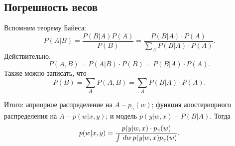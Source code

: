 \subsection{Погрешность весов}

Вспомним теорему Байеса:
\begin{equation*}
    P(A|B) = \frac{P(B|A) P(A)}{P(B)} = 
    \frac{P(B|A) \cdot P(A)}{\sum_A P(B|A) \cdot P(A)}.
\end{equation*}
Действительно,
\begin{equation*}
    P(A, B) = P(A|B) \cdot P(B) = P(B|A) \cdot P(A).
\end{equation*}
Также можно записать, что
\begin{equation*}
    P(B) = \sum_A P(A, B) = \sum_A P(B|A) \cdot P(A).
\end{equation*}

Итого: априорное распределение на $A$ -- $p_\gamma (w)$;
функция апостериорного распределения на $A$ -- $p(w | x, y)$;
и модель $p(y|w, x)$ -- $P(B|A)$. Тогда
\begin{equation*}
    p(w|x, y) = \frac{p(y | w, x) \cdot p_\gamma(w)}{\int \, d w\, p(y|w, x) p_\gamma(w) }.
\end{equation*}
